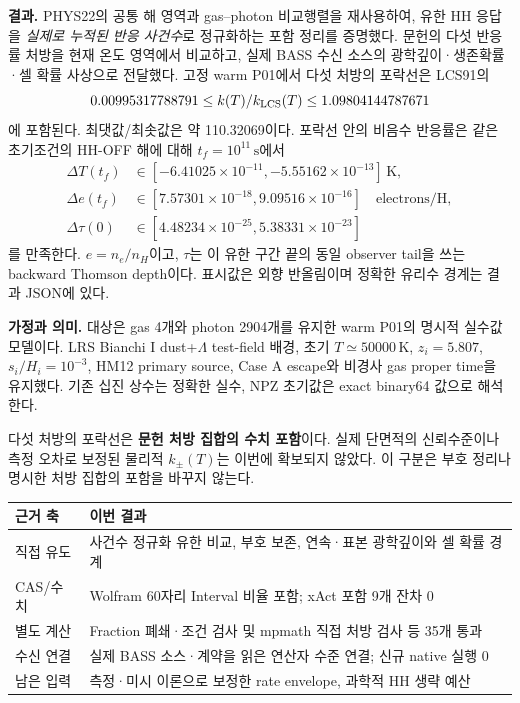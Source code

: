 \documentclass[11pt,a4paper]{article}
\begin{document}
\textbf{결과.} PHYS22의 공통 해 영역과 gas--photon 비교행렬을 재사용하여, 유한 HH 응답을 \emph{실제로 누적된 반응 사건수}로 정규화하는 포함 정리를 증명했다. 문헌의 다섯 반응률 처방을 현재 온도 영역에서 비교하고, 실제 BASS 수신 소스의 광학깊이·생존확률·셀 확률 사상으로 전달했다. 고정 warm P01에서 다섯 처방의 포락선은 LCS91의
\begin{equation}
 0.00995317788791\le k(T)/k_{\rm LCS}(T)\le1.09804144787671
\end{equation}
에 포함된다. 최댓값/최솟값은 약 110.32069이다. 포락선 안의 비음수 반응률은 같은 초기조건의 HH-OFF 해에 대해 $t_f=10^{11}\,\mathrm s$에서
\begin{align}
 \Delta T(t_f)&\in[-6.41025\times10^{-11},-5.55162\times10^{-13}]\,\mathrm K,\\
 \Delta e(t_f)&\in[7.57301\times10^{-18},9.09516\times10^{-16}]\quad\text{electrons/H},\\
 \Delta\tau(0)&\in[4.48234\times10^{-25},5.38331\times10^{-23}]
\end{align}
를 만족한다. $e=n_e/n_H$이고, $\tau$는 이 유한 구간 끝의 동일 observer tail을 쓰는 backward Thomson depth이다. 표시값은 외향 반올림이며 정확한 유리수 경계는 결과 JSON에 있다.

\textbf{가정과 의미.} 대상은 gas 4개와 photon 2904개를 유지한 warm P01의 명시적 실수값 모델이다. LRS Bianchi I dust+$\Lambda$ test-field 배경, 초기 $T\simeq50000\,\mathrm K$, $z_i=5.807$, $s_i/H_i=10^{-3}$, HM12 primary source, Case A escape와 비경사 gas proper time을 유지했다. 기존 십진 상수는 정확한 실수, NPZ 초기값은 exact binary64 값으로 해석한다.

다섯 처방의 포락선은 \textbf{문헌 처방 집합의 수치 포함}이다. 실제 단면적의 신뢰수준이나 측정 오차로 보정된 물리적 $k_\pm(T)$는 이번에 확보되지 않았다. 이 구분은 부호 정리나 명시한 처방 집합의 포함을 바꾸지 않는다.

\begin{center}\begin{tabularx}{\linewidth}{@{}lX@{}}\toprule
근거 축 & 이번 결과\\\midrule
직접 유도 & 사건수 정규화 유한 비교, 부호 보존, 연속·표본 광학깊이와 셀 확률 경계\\
CAS/수치 & Wolfram 60자리 Interval 비율 포함; xAct 포함 9개 잔차 0\\
별도 계산 & Fraction 폐쇄·조건 검사 및 mpmath 직접 처방 검사 등 35개 통과\\
수신 연결 & 실제 BASS 소스·계약을 읽은 연산자 수준 연결; 신규 native 실행 0\\
남은 입력 & 측정·미시 이론으로 보정한 rate envelope, 과학적 HH 생략 예산\\\bottomrule
\end{tabularx}\end{center}
\end{document}
